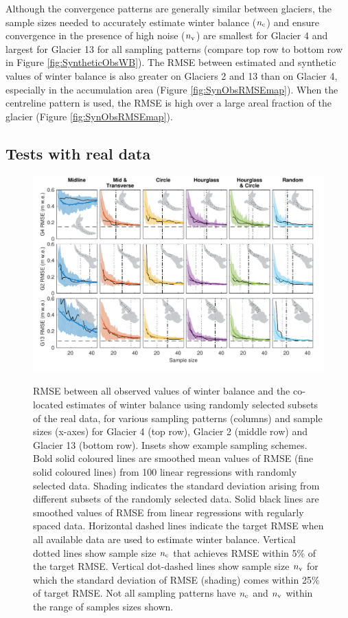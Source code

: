 \documentclass{article}
\begin{document}
Although the convergence patterns are generally similar between glaciers, the sample sizes needed to accurately estimate winter balance ($n_{\rm c}$) and ensure convergence in the presence of high noise ($n_{\rm v}$) are smallest for Glacier 4 and largest for Glacier 13 for all sampling patterns (compare top row to bottom row in Figure  \ref{fig:SyntheticObsWB}). The RMSE between estimated and synthetic values of winter balance is also greater on Glaciers 2 and 13 than on Glacier 4, especially in the accumulation area (Figure \ref{fig:SynObsRMSEmap}). When the centreline pattern is used, the RMSE is high over a large areal fraction of the glacier (Figure \ref{fig:SynObsRMSEmap}).

\subsection{Tests with real data}

\begin{figure}
	\centering
	\includegraphics[width =\textwidth]{Pulwicki_Fig5.pdf}\\
	\caption{RMSE between all observed values of winter balance and the co-located estimates of winter balance using randomly selected subsets of the real data, for various sampling patterns (columns) and sample sizes (x-axes) for Glacier 4 (top row), Glacier 2 (middle row) and Glacier 13 (bottom row). Insets show example sampling schemes. Bold solid coloured lines are smoothed mean values of RMSE (fine solid coloured lines) from 100 linear regressions with randomly selected data. Shading indicates the standard deviation arising from different subsets of the randomly selected data. Solid black lines are smoothed values of RMSE from linear regressions with regularly spaced data. Horizontal dashed lines indicate the target RMSE when all available data are used to estimate winter balance.  Vertical dotted lines show sample size $n_{\rm c}$ that achieves RMSE within 5\% of the target RMSE. Vertical dot-dashed lines show sample size $n_{\rm v}$ for which the standard deviation of  RMSE (shading) comes within 25\% of target RMSE. Not all sampling patterns have $n_{\rm c}$ and $n_{\rm v}$ within the range of samples sizes shown.}
	\label{fig:RealObsWB}
\end{figure}
\end{document}
